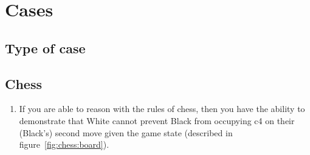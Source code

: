 
\chapter{Cases}
\label{cha:cases}

\section{Type of case}
\label{sec:type-case}

\section{Chess}
\label{sec:chess}

\begin{note}[Information]
\begin{enumerate}
\item\label{chess:claim:1}\label{chess:claim:1:conditional} If you are able to reason with the rules of chess, then you have the ability to demonstrate that White cannot prevent Black from occupying c4 on their (Black's) second move given the game state (described in figure~\ref{fig:chess:board}).
\end{enumerate}
\end{note}


